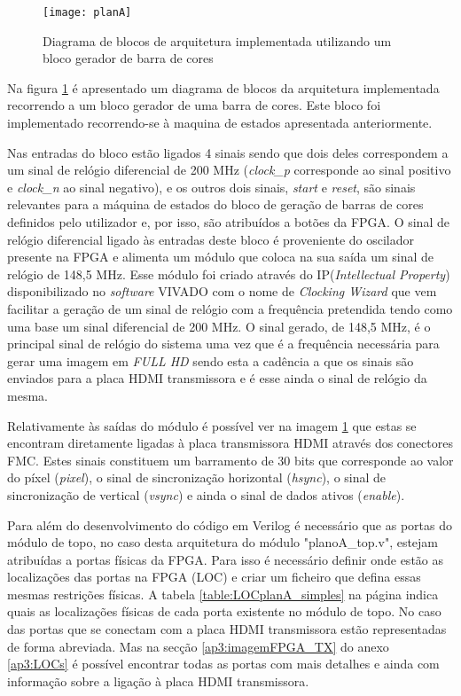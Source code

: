 \begin{figure}[h!]
	\begin{center}
		\leavevmode
		\texttt{[image: planA]}
		\caption{Diagrama de blocos de arquitetura implementada utilizando um bloco gerador de barra de cores}
		\label{fig:planA}
	\end{center}
\end{figure}

Na figura \ref{fig:planA} é apresentado um diagrama de blocos da arquitetura implementada recorrendo a um bloco gerador de uma barra de cores. Este bloco foi implementado recorrendo-se à maquina de estados apresentada anteriormente.

Nas entradas do bloco estão ligados 4 sinais sendo que dois deles correspondem a um sinal de relógio diferencial de 200 MHz (\textit{clock\_p} corresponde ao sinal positivo e \textit{clock\_n} ao sinal negativo), e os outros dois sinais, \textit{start} e \textit{reset}, são sinais relevantes para a máquina de estados do bloco de geração de barras de cores definidos pelo utilizador e, por isso, são atribuídos a botões da FPGA. O sinal de relógio diferencial ligado às entradas deste bloco é proveniente do oscilador presente na FPGA e alimenta um módulo que coloca na sua saída um sinal de relógio de 148,5 MHz. Esse módulo foi criado através do IP(\textit{Intellectual Property}) disponibilizado no \textit{software} VIVADO com o nome de \textit{Clocking Wizard} que vem facilitar a geração de um sinal de relógio com a frequência pretendida tendo como uma base um sinal diferencial de 200 MHz. O sinal gerado, de 148,5 MHz, é o principal sinal de relógio do sistema uma vez que é a frequência necessária para gerar uma imagem em \textit{FULL HD} sendo esta a cadência a que os sinais são enviados para a placa HDMI transmissora e é esse ainda o sinal de relógio da mesma.

Relativamente às saídas do módulo é possível ver na imagem \ref{fig:planA} que estas se encontram diretamente ligadas à placa transmissora HDMI através dos conectores FMC. Estes sinais constituem um barramento de 30 bits que corresponde ao valor do píxel (\textit{pixel}), o sinal de sincronização horizontal (\textit{hsync}), o sinal de sincronização de vertical (\textit{vsync}) e ainda o sinal de dados ativos (\textit{enable}).

Para além do desenvolvimento do código em Verilog é necessário que as portas do módulo de topo, no caso desta arquitetura do módulo "planoA\_top.v", estejam atribuídas a portas físicas da FPGA. Para isso é necessário definir onde estão as localizações das portas na FPGA (LOC) e criar um ficheiro que defina essas mesmas restrições físicas. A tabela \ref{table:LOCplanA_simples} na página \pageref{table:LOCplanA_simples} indica quais as localizações físicas de cada porta existente no módulo de topo. No caso das portas que se conectam com a placa HDMI transmissora estão representadas de forma abreviada. Mas na secção \ref{ap3:imagemFPGA_TX} do anexo \ref{ap3:LOCs} é possível encontrar todas as portas com mais detalhes e ainda com informação sobre a ligação à placa HDMI transmissora.

